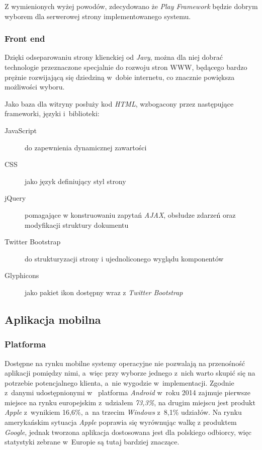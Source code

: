 \documentclass[11pt]{aghdpl}
\begin{document}
Z wymienionych wyżej powodów, zdecydowano że \emph{Play Framework} będzie dobrym wyborem dla serwerowej strony implementowanego systemu.

\subsubsection{Front end}
Dzięki odseparowaniu strony klienckiej od \emph{Javy}, można dla niej dobrać technologie przeznaczone specjalnie do rozwoju stron WWW, będącego bardzo prężnie rozwijającą się dziedziną w~dobie internetu, co znacznie powiększa możliwości wyboru.

Jako baza dla witryny posłuży kod \emph{HTML}, wzbogacony przez następujące frameworki, języki i~biblioteki:

\begin{description}
\item[JavaScript] do zapewnienia dynamicznej zawartości
\item[CSS] jako język definiujący styl strony
\item[jQuery] pomagające w konstruowaniu zapytań \emph{AJAX}, obsłudze zdarzeń oraz modyfikacji struktury dokumentu
\item[Twitter Bootstrap] do strukturyzacji strony i ujednoliconego wyglądu komponentów
\item[Glyphicons] jako pakiet ikon dostępny wraz z \emph{Twitter Bootstrap}
\end{description}

\subsection{Aplikacja mobilna}

\subsubsection{Platforma}

Dostępne na rynku mobilne systemy operacyjne nie pozwalają na przenośność aplikacji pomiędzy nimi, a~więc przy wyborze jednego z~nich warto skupić się na potrzebie potencjalnego klienta, a~nie wygodzie w~implementacji. Zgodnie z~danymi udostępnionymi w~\cite{AMS} platforma \emph{Android} w~roku 2014 zajmuje pierwsze miejsce na rynku europejskim z~udziałem \emph{73,3\%}, na drugim miejscu jest produkt \emph{Apple} z~wynikiem 16,6\%, a~na trzecim \emph{Windows} z~8,1\% udziałów. Na rynku amerykańskim sytuacja \emph{Apple} poprawia się wyrównując walkę z produktem \emph{Google}, jednak tworzona aplikacja dostosowana jest dla polskiego odbiorcy, więc statystyki zebrane w~Europie są tutaj bardziej znaczące.
\end{document}
